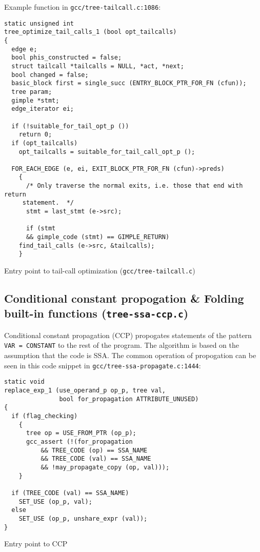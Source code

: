 \documentclass[11pt]{article}
\begin{document}
Example function in \texttt{gcc/tree-tailcall.c:1086}:
\begin{listing}[H]
\begin{verbatim}
static unsigned int
tree_optimize_tail_calls_1 (bool opt_tailcalls)
{
  edge e;
  bool phis_constructed = false;
  struct tailcall *tailcalls = NULL, *act, *next;
  bool changed = false;
  basic_block first = single_succ (ENTRY_BLOCK_PTR_FOR_FN (cfun));
  tree param;
  gimple *stmt;
  edge_iterator ei;

  if (!suitable_for_tail_opt_p ())
    return 0;
  if (opt_tailcalls)
    opt_tailcalls = suitable_for_tail_call_opt_p ();

  FOR_EACH_EDGE (e, ei, EXIT_BLOCK_PTR_FOR_FN (cfun)->preds)
    {
      /* Only traverse the normal exits, i.e. those that end with return
	 statement.  */
      stmt = last_stmt (e->src);

      if (stmt
	  && gimple_code (stmt) == GIMPLE_RETURN)
	find_tail_calls (e->src, &tailcalls);
    }
\end{verbatim}
\caption{Entry point to tail-call optimization (\texttt{gcc/tree-tailcall.c})}
\end{listing}
\subsection{Conditional constant propogation \& Folding built-in functions (\texttt{tree-ssa-ccp.c})}
\label{sec:org92465e6}
Conditional constant propagation (CCP) propogates statements of the pattern
\texttt{VAR = CONSTANT} to the rest of the program. The algorithm is based on the
assumption that the code is SSA. The common operation of propogation can be seen
in this code snippet in \texttt{gcc/tree-ssa-propagate.c:1444}:

\begin{listing}[H]
\begin{verbatim}
static void
replace_exp_1 (use_operand_p op_p, tree val,
    	       bool for_propagation ATTRIBUTE_UNUSED)
{
  if (flag_checking)
    {
      tree op = USE_FROM_PTR (op_p);
      gcc_assert (!(for_propagation
		  && TREE_CODE (op) == SSA_NAME
		  && TREE_CODE (val) == SSA_NAME
		  && !may_propagate_copy (op, val)));
    }

  if (TREE_CODE (val) == SSA_NAME)
    SET_USE (op_p, val);
  else
    SET_USE (op_p, unshare_expr (val));
}
\end{verbatim}
\caption{Entry point to CCP}
\end{listing}
\end{document}

